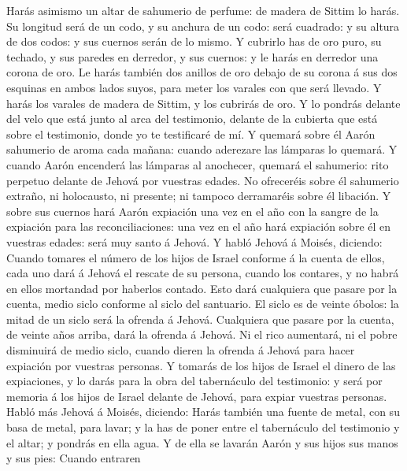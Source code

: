  Harás asimismo un altar de sahumerio de perfume: de
madera de Sittim lo harás.  Su longitud será de un codo, y
su anchura de un codo: será cuadrado: y su altura de dos codos: y sus
cuernos serán de lo mismo.  Y cubrirlo has de oro puro, su
techado, y sus paredes en derredor, y sus cuernos: y le harás en
derredor una corona de oro.  Le harás también dos anillos
de oro debajo de su corona á sus dos esquinas en ambos lados suyos, para
meter los varales con que será llevado.  Y harás los
varales de madera de Sittim, y los cubrirás de oro.  Y lo
pondrás delante del velo que está junto al arca del testimonio, delante
de la cubierta que está sobre el testimonio, donde yo te testificaré de
mí.  Y quemará sobre él Aarón sahumerio de aroma cada
mañana: cuando aderezare las lámparas lo quemará.  Y
cuando Aarón encenderá las lámparas al anochecer, quemará el sahumerio:
rito perpetuo delante de Jehová por vuestras edades.  No
ofreceréis sobre él sahumerio extraño, ni holocausto, ni presente; ni
tampoco derramaréis sobre él libación.  Y sobre sus
cuernos hará Aarón expiación una vez en el año con la sangre de la
expiación para las reconciliaciones: una vez en el año hará expiación
sobre él en vuestras edades: será muy santo á Jehová.  Y
habló Jehová á Moisés, diciendo:  Cuando tomares el
número de los hijos de Israel conforme á la cuenta de ellos, cada uno
dará á Jehová el rescate de su persona, cuando los contares, y no habrá
en ellos mortandad por haberlos contado.  Esto dará
cualquiera que pasare por la cuenta, medio siclo conforme al siclo del
santuario. El siclo es de veinte óbolos: la mitad de un siclo será la
ofrenda á Jehová.  Cualquiera que pasare por la cuenta,
de veinte años arriba, dará la ofrenda á Jehová.  Ni el
rico aumentará, ni el pobre disminuirá de medio siclo, cuando dieren la
ofrenda á Jehová para hacer expiación por vuestras personas.
 Y tomarás de los hijos de Israel el dinero de las
expiaciones, y lo darás para la obra del tabernáculo del testimonio: y
será por memoria á los hijos de Israel delante de Jehová, para expiar
vuestras personas.  Habló más Jehová á Moisés, diciendo:
 Harás también una fuente de metal, con su basa de metal,
para lavar; y la has de poner entre el tabernáculo del testimonio y el
altar; y pondrás en ella agua.  Y de ella se lavarán
Aarón y sus hijos sus manos y sus pies:  Cuando entraren
